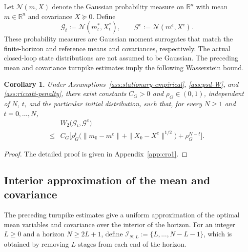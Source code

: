 \documentclass[10pt,journal,twoside]{IEEEtran}
\newtheorem{corollary}{Corollary}
\theoremstyle{definition}
\theoremstyle{remark}
\begin{document}
Let \(\mathcal N(m,X)\) denote the Gaussian probability measure on
\(\mathbb R^n\) with mean \(m\in\mathbb R^n\) and covariance
\(X\succeq0\). Define
\begin{equation*}
    \mathcal G_t
    :=
    \mathcal N(m_t^*,X_t^*),
    \qquad
    \mathcal G^e
    :=
    \mathcal N(m^e,X^e).
\end{equation*}
These probability measures are Gaussian moment surrogates that match the
finite-horizon and reference means and covariances, respectively. The actual
closed-loop state distributions are not assumed to be Gaussian. The preceding
mean and covariance turnpike estimates imply the following Wasserstein bound.

\begin{corollary}
    \label{cor:gaussian-surrogate-turnpike}
    Under Assumptions~\ref{ass:stationary-empirical},
    \ref{ass:psd-W}, and \ref{ass:riccati-penalty}, there exist constants
    \(C_G>0\) and \(\rho_G\in(0,1)\), independent of \(N\), \(t\), and the
    particular initial distribution, such that, for every \(N\ge1\) and
    \(t=0,\ldots,N\),
    \begin{equation}
        \begin{aligned}
            &W_2\bigl(\mathcal G_t,\mathcal G^e\bigr)\\
            \leq&
            C_G\Big[
                \rho_G^t
                \bigl(
                    \|m_0-m^e\|
                    +
                    \|X_0-X^e\|^{1/2}
                \bigr)+
                \rho_G^{N-t}
            \Big].
        \end{aligned}
        \label{eq:gaussian-surrogate-W2-bound}
    \end{equation}
\end{corollary}


\begin{proof}
	{The detailed proof is given in
	Appendix~\ref{app:cro1}.}
\end{proof}


\subsection{Interior approximation of the mean and covariance}
\label{subsec:interior-static-approximation}

The preceding turnpike estimates give a uniform approximation of the optimal
mean variables and covariance over the interior of the horizon. For an integer
\(L\ge0\) and a horizon \(N\ge2L+1\), define $\mathcal I_{N,L}
	:=
	\{L,\ldots,N-L-1\}$, which is obtained by removing \(L\) stages from each end
of the horizon.
\end{document}
